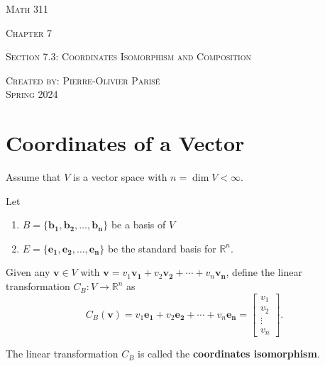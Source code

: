 \documentclass[20pt,a4paper]{extarticle}
\newcommand{\ra}{\rightarrow}
\newcounter{definition}
\begin{document}
\thispagestyle{empty}

\begin{center}
\vspace*{0.75cm}

{\Huge \textsc{Math 311}}

\vspace*{1.5cm}

{\LARGE \textsc{Chapter 7}} 

\vspace*{0.75cm}

\noindent\textsc{Section 7.3: Coordinates Isomorphism and Composition}

\vspace*{0.25cm}

\tableofcontents

\vfill

\noindent \textsc{Created by: Pierre-Olivier Paris{\'e}} \\
\textsc{Spring 2024}
\end{center}

\newpage

\section{Coordinates of a Vector}

Assume that $V$ is a vector space with $n = \dim V < \infty$.

Let 
	\begin{enumerate}[label=\Circled{\arabic*}]
	\item $B = \{ \mathbf{b_1} , \mathbf{b_2} , \ldots , \mathbf{b_n} \}$ be a basis of $V$
	\item $E = \{ \mathbf{e_1} , \mathbf{e_2} , \ldots , \mathbf{e_n} \}$ be the standard basis for $\mathbb{R}^n$. 
	\end{enumerate}

Given any $\mathbf{v} \in V$ with $\mathbf{v} = v_1 \mathbf{v_1} + v_2 \mathbf{v_2} + \cdots + v_n \mathbf{v_n}$, define the linear transformation $C_B : V \ra \mathbb{R}^n$ as
	\[
		C_B (\mathbf{v}) = v_1 \mathbf{e_1} + v_2 \mathbf{e_2} + \cdots + v_n \mathbf{e_n} = \begin{bmatrix} v_1 \\ v_2 \\ \vdots \\ v_n \end{bmatrix} .
	\]

\begin{definition}
The linear transformation $C_B$ is called the \textbf{coordinates isomorphism}.
\end{definition}
\end{document}
